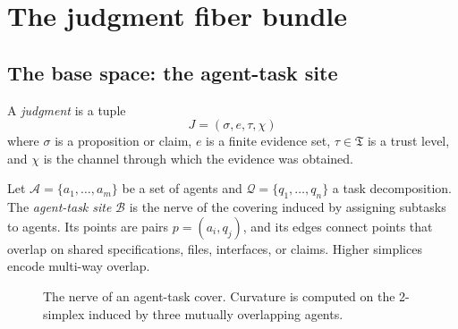 \documentclass[11pt]{article}
\newcommand{\Base}{\mathcal{B}}
\newcommand{\Trust}{\mathfrak{T}}
\newcommand{\Agents}{\mathcal{A}}
\newcommand{\Tasks}{\mathcal{Q}}
\newcommand{\Claim}{\sigma}
\newcommand{\Evidence}{e}
\newcommand{\Channel}{\chi}
\newcommand{\TrustVar}{\tau}
\begin{document}
\section{The judgment fiber bundle}\label{sec:bundle-construction}

\subsection{The base space: the agent-task site}

\begin{definition}[Judgment]
A \emph{judgment} is a tuple
\[
  J = (\Claim, \Evidence, \TrustVar, \Channel)
\]
where $\Claim$ is a proposition or claim, $\Evidence$ is a finite evidence set,
$\TrustVar \in \Trust$ is a trust level, and $\Channel$ is the channel through
which the evidence was obtained.
\end{definition}

\begin{definition}
Let $\Agents = \{a_1,\dots,a_m\}$ be a set of agents and
$\Tasks = \{q_1,\dots,q_n\}$ a task decomposition.  The \emph{agent-task site}
$\Base$ is the nerve of the covering induced by assigning subtasks to agents.
Its points are pairs $p=(a_i,q_j)$, and its edges connect points that overlap on
shared specifications, files, interfaces, or claims.  Higher simplices encode
multi-way overlap.
\end{definition}

\begin{figure}[H]
\centering
{}
\caption{The nerve of an agent-task cover.  Curvature is computed on the
2-simplex induced by three mutually overlapping agents.}
\label{fig:agent-nerve}
\end{figure}
\end{document}
